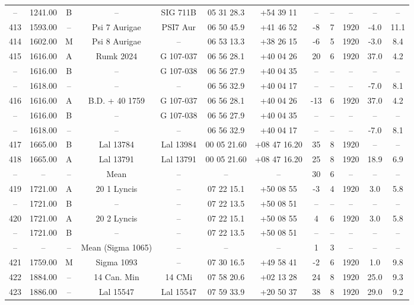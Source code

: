 \begin{table}
\begin{tabular}{cccccccccccc}
-- & 1241.00 & B & -- & SIG 711B & 05 31 28.3 & +54 39 11 & -- & -- & -- & -- & -- \\
413 & 1593.00 & -- & Psi 7 Aurigae & PSI7 Aur & 06 50 45.9 & +41 46 52 & -8 & 7 & 1920 & -4.0 & 11.1 \\
414 & 1602.00 & M & Psi 8 Aurigae & -- & 06 53 13.3 & +38 26 15 & -6 & 5 & 1920 & -3.0 & 8.4 \\
415 & 1616.00 & A & Rumk 2024 & G 107-037 & 06 56 28.1 & +40 04 26 & 20 & 6 & 1920 & 37.0 & 4.2 \\
-- & 1616.00 & B & -- & G 107-038 & 06 56 27.9 & +40 04 35 & -- & -- & -- & -- & -- \\
-- & 1618.00 & -- & -- & -- & 06 56 32.9 & +40 04 17 & -- & -- & -- & -7.0 & 8.1 \\
416 & 1616.00 & A & B.D. + 40  1759 & G 107-037 & 06 56 28.1 & +40 04 26 & -13 & 6 & 1920 & 37.0 & 4.2 \\
-- & 1616.00 & B & -- & G 107-038 & 06 56 27.9 & +40 04 35 & -- & -- & -- & -- & -- \\
-- & 1618.00 & -- & -- & -- & 06 56 32.9 & +40 04 17 & -- & -- & -- & -7.0 & 8.1 \\
417 & 1665.00 & B & Lal 13784 & Lal 13984 & 00 05 21.60 & +08 47 16.20 & 35 & 8 & 1920 & -- & -- \\
418 & 1665.00 & A & Lal 13791 & Lal 13791 & 00 05 21.60 & +08 47 16.20 & 25 & 8 & 1920 & 18.9 & 6.9 \\
-- & -- & -- & Mean & -- & -- & -- & 30 & 6 & -- & -- & -- \\
419 & 1721.00 & A & 20 1 Lyncis & -- & 07 22 15.1 & +50 08 55 & -3 & 4 & 1920 & 3.0 & 5.8 \\
-- & 1721.00 & B & -- & -- & 07 22 13.5 & +50 08 51 & -- & -- & -- & -- & -- \\
420 & 1721.00 & A & 20 2 Lyncis & -- & 07 22 15.1 & +50 08 55 & 4 & 6 & 1920 & 3.0 & 5.8 \\
-- & 1721.00 & B & -- & -- & 07 22 13.5 & +50 08 51 & -- & -- & -- & -- & -- \\
-- & -- & -- & Mean (Sigma 1065) & -- & -- & -- & 1 & 3 & -- & -- & -- \\
421 & 1759.00 & M & Sigma 1093 & -- & 07 30 16.5 & +49 58 41 & -2 & 6 & 1920 & 1.0 & 9.8 \\
422 & 1884.00 & -- & 14 Can. Min & 14 CMi & 07 58 20.6 & +02 13 28 & 24 & 8 & 1920 & 25.0 & 9.3 \\
423 & 1886.00 & -- & Lal 15547 & Lal 15547 & 07 59 33.9 & +20 50 37 & 38 & 8 & 1920 & 29.0 & 9.2 \\

\end{tabular}
\end{table}
